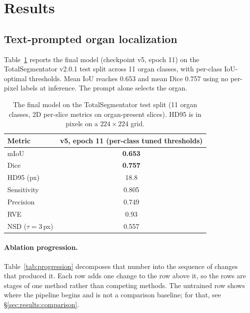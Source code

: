 \section{Results}
\label{sec:results}

\subsection{Text-prompted organ localization}
\label{sec:results:phase1}

Table~\ref{tab:overall} reports the final model (checkpoint v5, epoch 11) on the
TotalSegmentator v2.0.1 test split across 11 organ classes, with per-class
IoU-optimal thresholds. Mean IoU reaches 0.653 and mean Dice 0.757 using no
per-pixel labels at inference. The prompt alone selects the organ.

\begin{table}[t]
\centering
\caption{The final model on the TotalSegmentator test split (11 organ classes,
2D per-slice metrics on organ-present slices). HD95 is in pixels on a
$224\times224$ grid.}
\label{tab:overall}
\begin{tabular}{lc}
\toprule
Metric & v5, epoch 11 (per-class tuned thresholds) \\
\midrule
mIoU              & \textbf{0.653} \\
Dice              & \textbf{0.757} \\
HD95 (px)         & 18.8 \\
Sensitivity       & 0.805 \\
Precision         & 0.749 \\
RVE               & 0.93 \\
NSD ($\tau=3$\,px) & 0.557 \\
\bottomrule
\end{tabular}
\end{table}

\paragraph{Ablation progression.}
Table~\ref{tab:progression} decomposes that number into the sequence of changes
that produced it. Each row adds one change to the row above it, so the rows are
stages of one method rather than competing methods. The untrained row shows
where the pipeline begins and is not a comparison baseline; for that, see
\S\ref{sec:results:comparison}.

